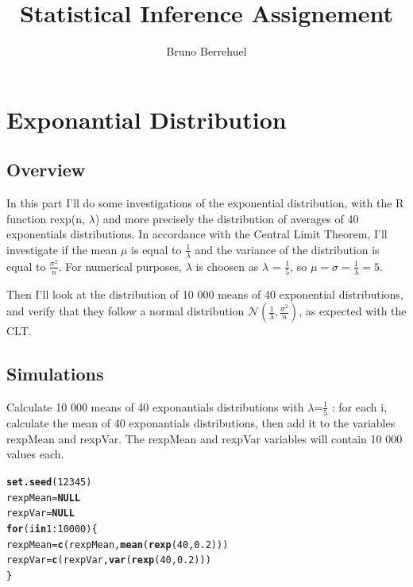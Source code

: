 \documentclass[a4paper, 10pt]{article}\usepackage[]{graphicx}\usepackage[]{color}
\makeatletter
\newcommand{\hlnum}[1]{\textcolor[rgb]{0.686,0.059,0.569}{#1}}%
\newcommand{\hlopt}[1]{\textcolor[rgb]{0,0,0}{#1}}%
\newcommand{\hlstd}[1]{\textcolor[rgb]{0.345,0.345,0.345}{#1}}%
\newcommand{\hlkwa}[1]{\textcolor[rgb]{0.161,0.373,0.58}{\textbf{#1}}}%
\newcommand{\hlkwb}[1]{\textcolor[rgb]{0.69,0.353,0.396}{#1}}%
\newcommand{\hlkwd}[1]{\textcolor[rgb]{0.737,0.353,0.396}{\textbf{#1}}}%
\newenvironment{kframe}{%
 \def\at@end@of@kframe{}%
 \ifinner\ifhmode%
  \def\at@end@of@kframe{\end{minipage}}%
  \begin{minipage}{\columnwidth}%
 \fi\fi%
 \def\FrameCommand##1{\hskip\@totalleftmargin \hskip-\fboxsep
 \colorbox{shadecolor}{##1}\hskip-\fboxsep
     \hskip-\linewidth \hskip-\@totalleftmargin \hskip\columnwidth}%
 \MakeFramed {\advance\hsize-\width
   \@totalleftmargin\z@ \linewidth\hsize
   \@setminipage}}%
 {\par\unskip\endMakeFramed%
 \at@end@of@kframe}
\newenvironment{knitrout}{}{} %
\makeatother
\begin{document}
\title{Statistical Inference Assignement}
\author{Bruno Berrehuel}

\maketitle

\section{Exponantial Distribution}
\subsection{Overview}

In this part I'll do some investigations of the exponential distribution, with the R function rexp(n, $\lambda$) and more precisely the distribution of averages of 40 exponentials distributions.
In accordance with the Central Limit Theorem, I'll investigate if the mean $\mu$ is equal to $\frac{1}{\lambda}$ and the variance  of the distribution is equal to $\frac{\sigma^2}{n}$.
For numerical purposes, $\lambda$ is choosen as $\lambda$ = $\frac{1}{5}$, so $\mu = \sigma = \frac{1}{\lambda} = 5$.


Then I'll look at the distribution of 10 000 means of 40 exponential distributions, and verify that they follow a  normal distribution $\mathcal{N}(\frac{1}{\lambda},\frac{\sigma^2}{n})$, as expected with the CLT.

\subsection{Simulations}

Calculate 10 000 means of 40 exponantials distributions with $\lambda$=$\frac{1}{5}$ : for each i, calculate the mean of 40 exponantials distributions, then add it to the variables rexpMean and rexpVar. The rexpMean and rexpVar variables will contain 10 000 values each.

\begin{knitrout}\small
{}\color{fgcolor}\begin{kframe}
\begin{alltt}
\hlkwd{set.seed}\hlstd{(}\hlnum{12345}\hlstd{)}
\hlstd{rexpMean}\hlkwb{=}\hlkwa{NULL}
\hlstd{rexpVar}\hlkwb{=}\hlkwa{NULL}
\hlkwa{for} \hlstd{(i} \hlkwa{in} \hlnum{1}\hlopt{:}\hlnum{10000}\hlstd{) \{}
    \hlstd{rexpMean} \hlkwb{=} \hlkwd{c}\hlstd{(rexpMean,} \hlkwd{mean}\hlstd{(}\hlkwd{rexp}\hlstd{(}\hlnum{40}\hlstd{,}\hlnum{0.2}\hlstd{)))}
    \hlstd{rexpVar} \hlkwb{=} \hlkwd{c}\hlstd{(rexpVar,} \hlkwd{var}\hlstd{(}\hlkwd{rexp}\hlstd{(}\hlnum{40}\hlstd{,}\hlnum{0.2}\hlstd{)))}
\hlstd{\}}
\end{alltt}
\end{kframe}
\end{knitrout}
\end{document}

